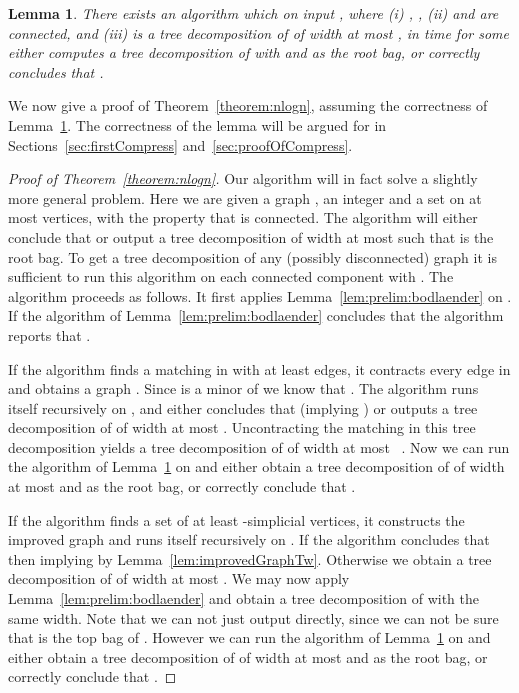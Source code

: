 \documentclass[a4paper,11pt]{article}
\newtheorem{lemma}{Lemma}[section]
\theoremstyle{definition}
\theoremstyle{remark}
\begin{document}
\begin{lemma}\label{lemma:nlogn-compression}
  There exists an algorithm which on input , where
  (i) , , (ii)  and  are connected, and (iii)  is a tree decomposition of
   of width at most , in  time for some
   either computes a tree decomposition  of 
  with  and  as the root bag, or correctly
  concludes that .
\end{lemma}

We now give a proof of Theorem~\ref{theorem:nlogn}, assuming the
correctness of Lemma~\ref{lemma:nlogn-compression}.  The correctness
of the lemma will be argued for in Sections~\ref{sec:firstCompress}
and~\ref{sec:proofOfCompress}.
 
\begin{proof}[Proof of Theorem~\ref{theorem:nlogn}]
  Our algorithm will in fact solve a slightly more general problem.
  Here we are given a graph , an integer  and a set  on at
  most  vertices, with the property that  is
  connected.  The algorithm will either conclude that  or
  output a tree decomposition of width at most  such that 
  is the root bag.  To get a tree decomposition of any (possibly
  disconnected) graph it is sufficient to run this algorithm on each
  connected component with .  The algorithm proceeds
  as follows.  It first applies Lemma~\ref{lem:prelim:bodlaender} on
  .  If the algorithm of Lemma~\ref{lem:prelim:bodlaender}
  concludes that  the algorithm reports that .
  
  If the algorithm finds a matching  in  with at least
   edges, it contracts every edge in  and
  obtains a graph .  Since  is a minor of  we know that
  .  The algorithm runs itself recursively on
  , and either concludes that 
  (implying ) or outputs a tree decomposition of  of
  width at most .  Uncontracting the matching in this tree
  decomposition yields a tree decomposition  of  of width
  at most ~\cite{Bodlaender96}.  Now we can run the algorithm of
  Lemma~\ref{lemma:nlogn-compression} on  and
  either obtain a tree decomposition of  of width at most 
  and  as the root bag, or correctly conclude that .
  
  If the algorithm finds a set  of at least 
  -simplicial vertices, it constructs the improved graph  and
  runs itself recursively on .  If
  the algorithm concludes that  then
   implying  by
  Lemma~\ref{lem:improvedGraphTw}.  Otherwise we obtain a tree
  decomposition of  of width at most .  We may
  now apply Lemma~\ref{lem:prelim:bodlaender} and obtain a tree
  decomposition  of  with the same width.  Note that we
  can not just output  directly, since we can not be sure
  that  is the top bag of .  However we can run the
  algorithm of Lemma~\ref{lemma:nlogn-compression} on
   and either obtain a tree decomposition of 
  of width at most  and  as the root bag, or correctly
  conclude that .
  

\end{proof}
\end{document}
